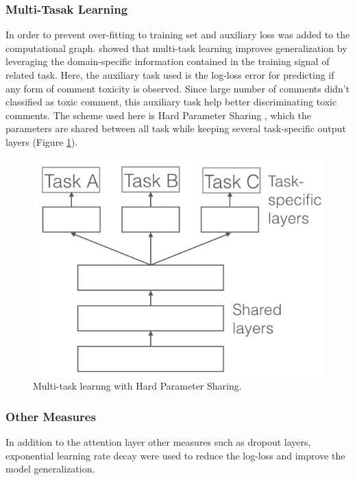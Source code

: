 \documentclass{article}
\begin{document}
    \subsubsection{Multi-Tasak Learning}
        In order to prevent over-fitting to training set and auxiliary loss was added to the computational graph. \cite{caruana1998multitask} showed that multi-task learning improves generalization by leveraging the domain-specific information contained in the training signal of related task. Here, the auxiliary task used is the log-loss error for predicting if any form of comment toxicity is observed. Since large number of comments didn't classified as toxic comment, this auxiliary task help better discriminating toxic comments. The scheme used here is Hard Parameter Sharing \cite{caruanamultitask}, which the parameters are shared between all task while keeping several task-specific output layers (Figure \ref{fig:mtl}).

        \begin{figure}
            \centering
            \includegraphics[scale=0.4]{mtl.png}
            \caption{Multi-task learnng with Hard Parameter Sharing.}
            \label{fig:mtl}
        \end{figure}

    \subsubsection{Other Measures}

    In addition to the attention layer other measures such as dropout layers, exponential learning rate decay were used to reduce the log-loss and improve the model generalization.
\end{document}
